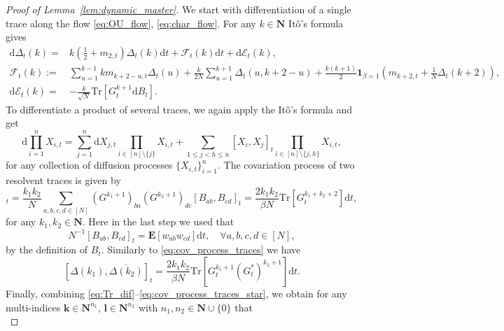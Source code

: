 \documentclass[10pt]{amsart}
\numberwithin{equation}{section}
\newcommand{\dif}{\mathrm{d}}
\newcommand{\E}{\mathbf{E}}
\newcommand{\N}{\mathbf{N}}
\begin{document}
\begin{proof}[Proof of Lemma~\ref{lem:dynamic_master}] We start with differentiation of a single trace along the flow \eqref{eq:OU_flow}, \eqref{eq:char_flow}. For any $k \in \N$ It\^{o}'s formula gives
\begin{equation}
\begin{split}
\dif \Delta_t(k) =& k\left(\frac{1}{2}+m_{2,t}\right) \Delta_t(k) \dif t + \mathcal{F}_t(k)\dif t + \dif \mathcal{E}_t(k),\\
\mathcal{F}_t(k):= &\sum_{u=1}^{k-1} km_{k+2-u,t} \Delta_t(u)+ \frac{k}{2N} \sum_{u=1}^{k+1} \Delta_t (u,k+2-u)+\frac{k(k+1)}{2}\bm{1}_{\beta=1}\left(\!m_{k+2,t}+\frac{1}{N}\Delta_t(k+2)\!\right)\!,\\
\dif \mathcal{E}_t(k) = &-\frac{k}{\sqrt{N}} \mathrm{Tr}[G_t^{k+1}\dif B_t].
\end{split}
\label{eq:Tr_dif}
\end{equation}
To differentiate a product of several traces, we again apply the It\^{o}'s formula and get
\begin{equation}
\dif \prod_{i=1}^n X_{i,t} = \sum_{j=1}^n \dif X_{j,t} \prod_{i\in[n]\setminus\{j\}} X_{i,t} + \sum_{1\le j<h\le n}[X_i,X_j]_t \prod_{i\in[n]\setminus\{j,h\}} X_{i,t},
\end{equation}
for any collection of diffusion processes $\{X_{i,t}\}_{i=1}^n$. The covariation process of two resolvent traces is given by
\begin{equation}
[\Delta(k_1),\Delta (k_2)]_t=\frac{k_1k_2}{N}\sum_{a,b,c,d\in [N]}(G^{k_1+1})_{ba}(G^{k_2+1})_{dc}[B_{ab},B_{cd}]_t = \frac{2k_1k_2}{\beta N}\mathrm{Tr}[G_t^{k_1+k_2+2}]\dif t,
\label{eq:cov_process_traces}
\end{equation}
for any $k_1,k_2\in \N$. Here in the last step we used that
\begin{equation}
N^{-1}[B_{ab},B_{cd}]_t = \E [w_{ab}w_{cd}]\dif t,\quad \forall a,b,c,d\in[N],
\end{equation}
by the definition of $B_t$. Similarly to \eqref{eq:cov_process_traces} we have
\begin{equation}
\left[\Delta(k_1),\overline{\Delta (k_2)}\right]_t=\frac{2k_1k_2}{\beta N}\mathrm{Tr}[G_t^{k_1+1}(G_t^*)^{k_2+1}]\dif t.
\label{eq:cov_process_traces_star}
\end{equation}
Finally, combining \eqref{eq:Tr_dif}--\eqref{eq:cov_process_traces_star}, we obtain for any multi-indices $\bm{k}\in\N^{n_1}$, $\bm{l}\in\N^{n_2}$ with $n_1,n_2\in\N\cup\{0\}$ that
\begin{equation}

\end{equation}
\end{proof}
\end{document}
